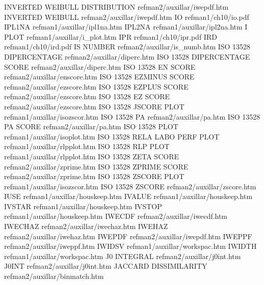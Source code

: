 INVERTED WEIBULL DISTRIBUTION           refman2/auxillar/iwepdf.htm
INVERTED WEIBULL                        refman2/auxillar/iwepdf.htm
IO                                      refman1/ch10/io.pdf
IPL1NA                                  refman1/auxillar/ipl1na.htm
IPL2NA                                  refman1/auxillar/ipl2na.htm
I PLOT                                  refman1/auxillar/i_plot.htm
IPR                                     refman1/ch10/ipr.pdf
IRD                                     refman1/ch10/ird.pdf
IS NUMBER                               refman2/auxillar/is_numb.htm
ISO 13528 DIPERCENTAGE                  refman2/auxillar/diperc.htm
ISO 13528 DIPERCENTAGE SCORE            refman2/auxillar/diperc.htm
ISO 13528 EN SCORE                      refman2/auxillar/enscore.htm
ISO 13528 EZMINUS SCORE                 refman2/auxillar/ezscore.htm
ISO 13528 EZPLUS SCORE                  refman2/auxillar/ezscore.htm
ISO 13528 EZ SCORE                      refman2/auxillar/ezscore.htm
ISO 13528 JSCORE PLOT                   refman1/auxillar/isozscor.htm
ISO 13528 PA                            refman2/auxillar/pa.htm
ISO 13528 PA SCORE                      refman2/auxillar/pa.htm
ISO 13528 PLOT                          refman1/auxillar/isoplot.htm
ISO 13528 RELA LABO PERF PLOT           refman1/auxillar/rlpplot.htm
ISO 13528 RLP PLOT                      refman1/auxillar/rlpplot.htm
ISO 13528 ZETA SCORE                    refman2/auxillar/zprime.htm
ISO 13528 ZPRIME SCORE                  refman2/auxillar/zprime.htm
ISO 13528 ZSCORE PLOT                   refman1/auxillar/isozscor.htm
ISO 13528 ZSCORE                        refman2/auxillar/zscore.htm
IUSE                                    refman1/auxillar/houskeep.htm
IVALUE                                  refman1/auxillar/houskeep.htm
IVSTAR                                  refman1/auxillar/houskeep.htm
IVSTOP                                  refman1/auxillar/houskeep.htm
IWECDF                                  refman2/auxillar/iwecdf.htm
IWECHAZ                                 refman2/auxillar/iwechaz.htm
IWEHAZ                                  refman2/auxillar/iwehaz.htm
IWEPDF                                  refman2/auxillar/iwepdf.htm
IWEPPF                                  refman2/auxillar/iweppf.htm
IWIDSV                                  refman1/auxillar/workspac.htm
IWIDTH                                  refman1/auxillar/workspac.htm
J0 INTEGRAL                             refman2/auxillar/j0int.htm
J0INT                                   refman2/auxillar/j0int.htm
JACCARD DISSIMILARITY                   refman2/auxillar/binmatch.htm
